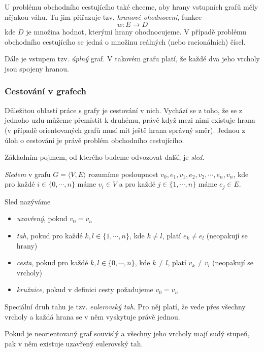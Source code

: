 \documentclass[
  printversion=false,
  joinlists=true,
  glossaries=true,
  figures=true,
  tables=true,
  sourcecodes=false,
  theorems=false,
  bibencoding=utf8,
  language=czech,
  encoding=utf8,
  program=infpvs,
  index=true,
  biblatex=true
]{kidiplom}
\begin{document}
U problému obchodního cestujícího také chceme, aby hrany vstupních grafů měly nějakou váhu. Tu jim přiřazuje tzv. \textit{hranové ohodnocení}, funkce $$w : E \rightarrow D$$
kde $D$ je množina hodnot, kterými hrany ohodnocujeme. V případě problému obchodního cestujícího se jedná o množinu reálných (nebo racionálních) čísel.\newline

Dále je vstupem tzv. \textit{úplný} graf. V takovém grafu platí, že každé dva jeho vrcholy  jsou spojeny hranou.

\subsubsection{Cestování v grafech}
Důležitou oblastí práce s grafy je cestování v nich. Vychází se z toho, že se z jednoho uzlu můžeme přemístit k druhému, právě když mezi nimi existuje hrana (v případě orientovaných grafů musí mít ještě hrana správný směr). Jednou z úloh o cestování je právě problém obchodního cestujícího.


Základním pojmem, od kterého budeme odvozovat další, je \textit{sled}.


\begin{definition}
\textit{Sledem} v grafu $G=\langle V, E \rangle$ rozumíme posloupnost $v_0, e_1, v_1, e_2, v_2, \cdots, e_n, v_n$, kde pro každé $i \in \{0,\cdots, n\}$ máme $v_i \in V$ a pro každé $j \in \{1, \cdots, n\}$ máme $e_j \in E$.
\end{definition}


Sled nazýváme
\begin{itemize}
\item \textit{uzavřený}, pokud $v_0 = v_n$
\item \textit{tah}, pokud pro každé $k, l \in \{1, \cdots, n\}$, kde $k \neq l$, platí $e_k \neq e_l$ (neopakují se hrany)
\item \textit{cesta}, pokud pro každé $k, l \in \{0, \cdots, n\}$, kde $k \neq l$, platí $v_k \neq v_l$ (neopakují se vrcholy)
\item \textit{kružnice}, pokud v definici cesty požadujeme $v_0 = v_n$
\end{itemize}

Speciální druh tahu je tzv. \textit{eulerovský tah}. Pro něj platí, že vede přes všechny vrcholy a každá hrana se v něm vyskytuje právě jednou. 

\begin{theorem}\label{theorem:eulerianCircout}
Pokud je neorientovaný graf souvislý a všechny jeho vrcholy mají sudý stupeň, pak v něm existuje uzavřený eulerovský tah.
\end{theorem}
\end{document}
